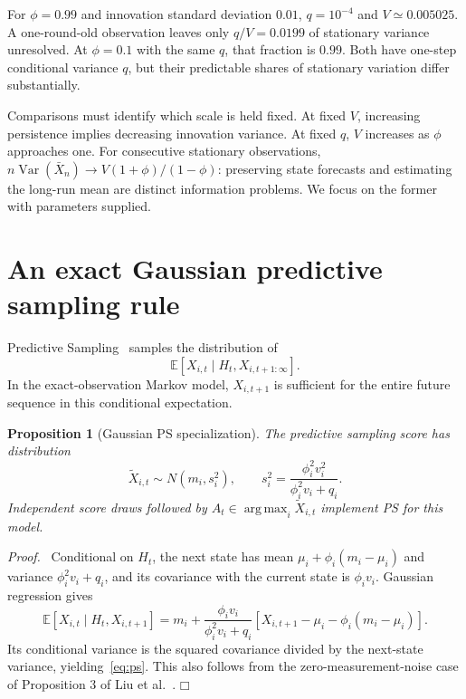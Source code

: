 \documentclass[11pt]{article}
\newtheorem{proposition}{Proposition}
\newenvironment{proof}{\par\noindent\textit{Proof.}\ }{\hfill$\mdlgwhtsquare$\par\medskip}
\newcommand{\E}{\mathbb E}
\newcommand{\argmax}{\operatorname*{arg\,max}}
\newcommand{\Var}{\operatorname{Var}}
\begin{document}
For $\phi=0.99$ and innovation standard deviation $0.01$, $q=10^{-4}$ and $V\simeq0.005025$. A one-round-old observation leaves only $q/V=0.0199$ of stationary variance unresolved. At $\phi=0.1$ with the same $q$, that fraction is $0.99$. Both have one-step conditional variance $q$, but their predictable shares of stationary variation differ substantially.

Comparisons must identify which scale is held fixed. At fixed $V$, increasing persistence implies decreasing innovation variance. At fixed $q$, $V$ increases as $\phi$ approaches one. For consecutive stationary observations, $n\Var(\bar X_n)\to V(1+\phi)/(1-\phi)$: preserving state forecasts and estimating the long-run mean are distinct information problems. We focus on the former with parameters supplied.

\section{An exact Gaussian predictive sampling rule}
Predictive Sampling~\cite{liu2023} samples the distribution of
\begin{equation}
\E[X_{i,t}\mid H_t,X_{i,t+1:\infty}].
\end{equation}
In the exact-observation Markov model, $X_{i,t+1}$ is sufficient for the entire future sequence in this conditional expectation.

\begin{proposition}[Gaussian PS specialization]
The predictive sampling score has distribution
\begin{equation}
\widetilde X_{i,t}\sim N(m_i,s_i^2),\qquad
s_i^2=\frac{\phi_i^2v_i^2}{\phi_i^2v_i+q_i}.
\label{eq:ps}
\end{equation}
Independent score draws followed by $A_t\in\argmax_i\widetilde X_{i,t}$ implement PS for this model.
\end{proposition}
\begin{proof}
Conditional on $H_t$, the next state has mean $\mu_i+\phi_i(m_i-\mu_i)$ and variance $\phi_i^2v_i+q_i$, and its covariance with the current state is $\phi_iv_i$. Gaussian regression gives
\[
\E[X_{i,t}\mid H_t,X_{i,t+1}]
=m_i+\frac{\phi_iv_i}{\phi_i^2v_i+q_i}
[X_{i,t+1}-\mu_i-\phi_i(m_i-\mu_i)].
\]
Its conditional variance is the squared covariance divided by the next-state variance, yielding~\eqref{eq:ps}. This also follows from the zero-measurement-noise case of Proposition 3 of Liu et al.~\cite{liu2023}.
\end{proof}
\end{document}
